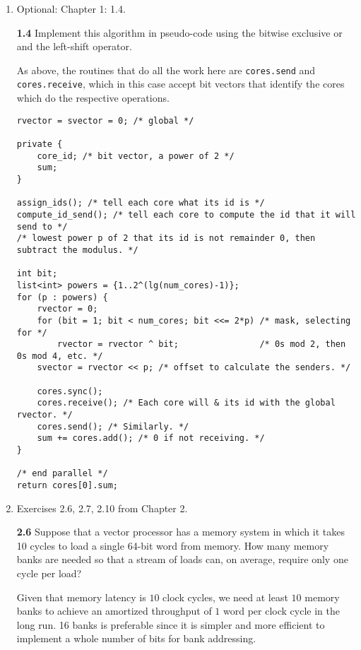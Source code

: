 \documentclass[11pt,epsfig,letterpaper]{article}
\begin{document}
\begin{enumerate}
\begin{verbatim}
\end{verbatim}

            \item Optional: Chapter 1: 1.4.

            {\bf 1.4} \>\> Implement this algorithm in pseudo-code using the bitwise exclusive or and the left-shift operator.

            \quad As above, the routines that do all the work here are {\tt cores.send} and {\tt cores.receive}, which in this case accept bit vectors that identify the cores which do the respective operations.

            \begin{verbatim}
rvector = svector = 0; /* global */

private {
    core_id; /* bit vector, a power of 2 */
    sum;
}

assign_ids(); /* tell each core what its id is */
compute_id_send(); /* tell each core to compute the id that it will send to */
/* lowest power p of 2 that its id is not remainder 0, then subtract the modulus. */

int bit;
list<int> powers = {1..2^(lg(num_cores)-1)};
for (p : powers) {
    rvector = 0;
    for (bit = 1; bit < num_cores; bit <<= 2*p) /* mask, selecting for */
        rvector = rvector ^ bit;                /* 0s mod 2, then 0s mod 4, etc. */
    svector = rvector << p; /* offset to calculate the senders. */

    cores.sync();
    cores.receive(); /* Each core will & its id with the global rvector. */
    cores.send(); /* Similarly. */
    sum += cores.add(); /* 0 if not receiving. */
}

/* end parallel */
return cores[0].sum;
\end{verbatim}


            \item Exercises 2.6, 2.7, 2.10 from Chapter 2.


            {\bf 2.6}  \>\>   Suppose that a vector processor has a memory system in which it takes 10 cycles to load a single 64-bit word from memory.
            How many memory banks are needed so that a stream of loads can, on average, require only one cycle per load?
            \vspace{0.5pc}

            \quad Given that memory latency is $10$ clock cycles, we need at least $10$ memory banks to achieve an amortized throughput of $1$ word per clock cycle in the long run. 16 banks is preferable since it is simpler and more efficient to implement a whole number of bits for bank addressing.


\end{enumerate}
\end{document}
